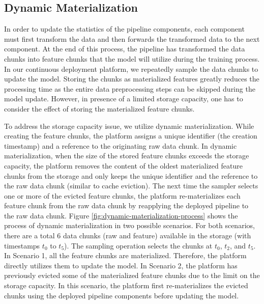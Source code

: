 \subsection{Dynamic Materialization}\label{subsec:dynamic-materialization}
In order to update the statistics of the pipeline components, each component must first transform the data and then forwards the transformed data to the next component.
At the end of this process, the pipeline has transformed the data chunks into feature chunks that the model will utilize during the training process.
In our continuous deployment platform, we repeatedly sample the data chunks to update the model.
Storing the chunks as materialized features greatly reduces the processing time as the entire data preprocessing steps can be skipped during the model update.
However, in presence of a limited storage capacity, one has to consider the effect of storing the materialized feature chunks.

To address the storage capacity issue, we utilize dynamic materialization.
While creating the feature chunks, the platform assigns a unique identifier (the creation timestamp) and a reference to the originating raw data chunk.
In dynamic materialization, when the size of the stored feature chunks exceeds the storage capacity, the platform removes the content of the oldest materialized feature chunks from the storage and only keeps the unique identifier and the reference to the raw data chunk (similar to cache eviction).
The next time the sampler selects one or more of the evicted feature chunks, the platform re-materializes each feature chunk from the raw data chunk by reapplying the deployed pipeline to the raw data chunk.
Figure \ref{fig:dynamic-materialization-process} shows the process of dynamic materialization in two possible scenarios.
For both scenarios, there are a total 6 data chunks (raw and feature) available in the storage (with timestamps $t_0$ to $t_5$).
The sampling operation selects the chunks at $t_0$, $t_2$, and $t_5$.
In Scenario 1, all the feature chunks are materialized.
Therefore, the platform directly utilizes them to update the model.
In Scenario 2, the platform has previously evicted some of the materialized feature chunks due to the limit on the storage capacity.
In this scenario, the platform first re-materializes the evicted chunks using the deployed pipeline components before updating the model.

